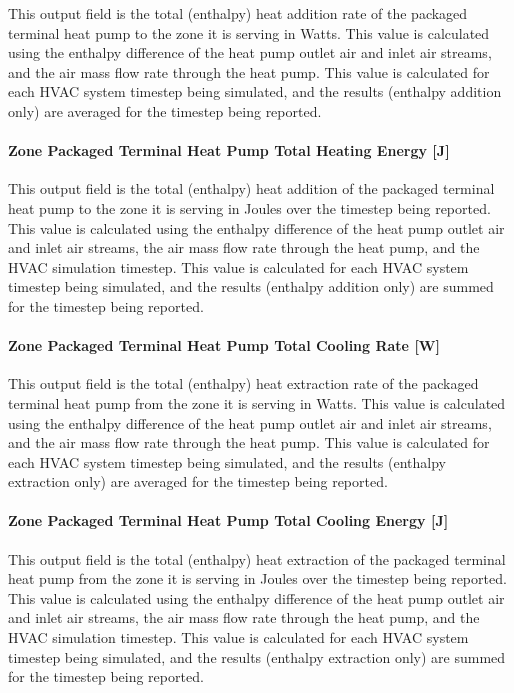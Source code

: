 This output field is the total (enthalpy) heat addition rate of the packaged terminal heat pump to the zone it is serving in Watts. This value is calculated using the enthalpy difference of the heat pump outlet air and inlet air streams, and the air mass flow rate through the heat pump. This value is calculated for each HVAC system timestep being simulated, and the results (enthalpy addition only) are averaged for the timestep being reported.

\paragraph{Zone Packaged Terminal Heat Pump Total Heating Energy {[}J{]}}\label{zone-packaged-terminal-heat-pump-total-heating-energy-j}

This output field is the total (enthalpy) heat addition of the packaged terminal heat pump to the zone it is serving in Joules over the timestep being reported. This value is calculated using the enthalpy difference of the heat pump outlet air and inlet air streams, the air mass flow rate through the heat pump, and the HVAC simulation timestep. This value is calculated for each HVAC system timestep being simulated, and the results (enthalpy addition only) are summed for the timestep being reported.

\paragraph{Zone Packaged Terminal Heat Pump Total Cooling Rate {[}W{]}}\label{zone-packaged-terminal-heat-pump-total-cooling-rate-w}

This output field is the total (enthalpy) heat extraction rate of the packaged terminal heat pump from the zone it is serving in Watts. This value is calculated using the enthalpy difference of the heat pump outlet air and inlet air streams, and the air mass flow rate through the heat pump. This value is calculated for each HVAC system timestep being simulated, and the results (enthalpy extraction only) are averaged for the timestep being reported.

\paragraph{Zone Packaged Terminal Heat Pump Total Cooling Energy {[}J{]}}\label{zone-packaged-terminal-heat-pump-total-cooling-energy-j}

This output field is the total (enthalpy) heat extraction of the packaged terminal heat pump from the zone it is serving in Joules over the timestep being reported. This value is calculated using the enthalpy difference of the heat pump outlet air and inlet air streams, the air mass flow rate through the heat pump, and the HVAC simulation timestep. This value is calculated for each HVAC system timestep being simulated, and the results (enthalpy extraction only) are summed for the timestep being reported.


